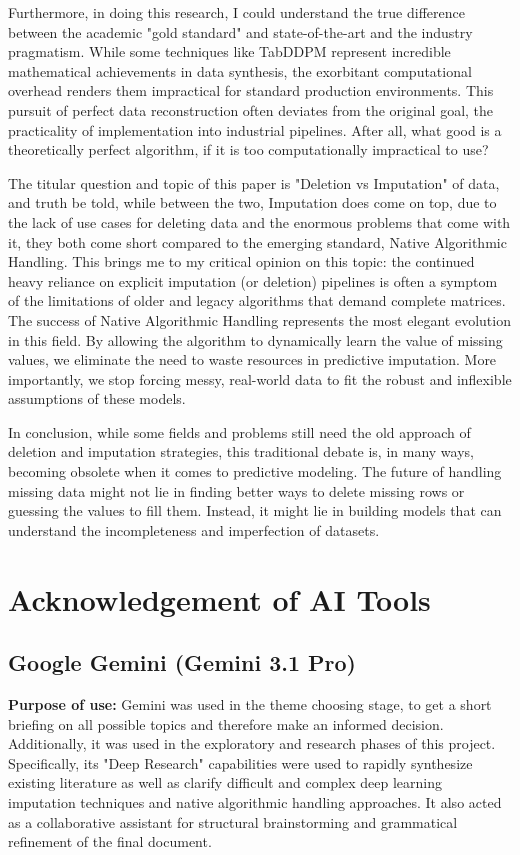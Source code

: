 \documentclass[journal]{IEEEtran}
\begin{document}
Furthermore, in doing this research, I could understand the true difference between the academic "gold standard" and state-of-the-art and the industry pragmatism. While some techniques like TabDDPM represent incredible mathematical achievements in data synthesis, the exorbitant computational overhead renders them impractical for standard production environments. This pursuit of perfect data reconstruction often deviates from the original goal, the practicality of implementation into industrial pipelines. After all, what good is a theoretically perfect algorithm, if it is too computationally impractical to use?

The titular question and topic of this paper is "Deletion vs Imputation" of data, and truth be told, while between the two, Imputation does come on top, due to the lack of use cases for deleting data and the enormous problems that come with it, they both come short compared to the emerging standard, Native Algorithmic Handling. This brings me to my critical opinion on this topic: the continued heavy reliance on explicit imputation (or deletion) pipelines is often a symptom of the limitations of older and legacy algorithms that demand complete matrices. The success of Native Algorithmic Handling represents the most elegant evolution in this field. By allowing the algorithm to dynamically learn the value of missing values, we eliminate the need to waste resources in predictive imputation. More importantly, we stop forcing messy, real-world data to fit the robust and inflexible assumptions of these models.

In conclusion, while some fields and problems still need the old approach of deletion and imputation strategies, this traditional debate is, in many ways, becoming obsolete when it comes to predictive modeling. The future of handling missing data might not lie in finding better ways to delete missing rows or guessing the values to fill them. Instead, it might lie in building models that can understand the incompleteness and imperfection of datasets.


\section{Acknowledgement of AI Tools}
\subsection{Google Gemini (Gemini 3.1 Pro)}
\noindent \textbf{Purpose of use:} Gemini was used in the theme choosing stage, to get a short briefing on all possible topics and therefore make an informed decision. Additionally, it was used in the exploratory and research phases of this project. Specifically, its "Deep Research" capabilities were used to rapidly synthesize existing literature as well as clarify difficult and complex deep learning imputation techniques and native algorithmic handling approaches. It also acted as a collaborative assistant for structural brainstorming and grammatical refinement of the final document.
\end{document}
